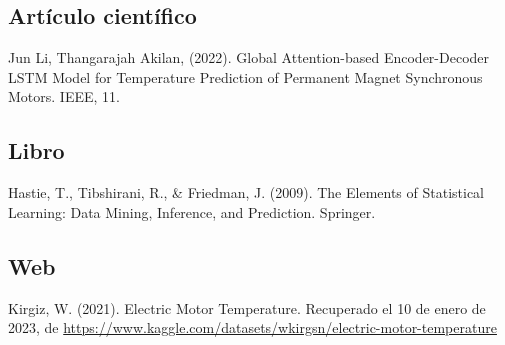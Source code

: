 \documentclass{article}
\begin{document}
\pagebreak







\subsection{Artículo científico}

 Jun Li, Thangarajah Akilan, (2022). Global Attention-based Encoder-Decoder LSTM Model for Temperature Prediction of Permanent Magnet Synchronous Motors. IEEE, 11.

\subsection{Libro}

 Hastie, T., Tibshirani, R., & Friedman, J. (2009). The Elements of Statistical Learning: Data Mining, Inference, and Prediction. Springer.

\subsection{Web}
Kirgiz, W. (2021). Electric Motor Temperature. Recuperado el 10 de enero de 2023, de \url{https://www.kaggle.com/datasets/wkirgsn/electric-motor-temperature}
\end{document}
